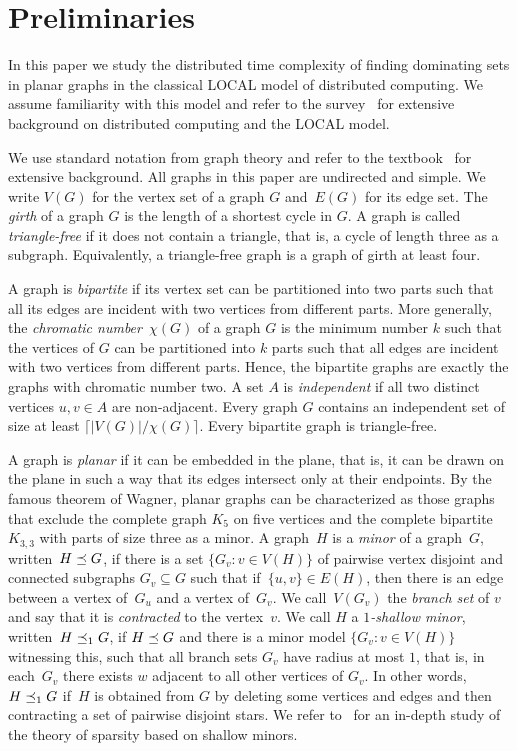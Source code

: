 
\section{Preliminaries}

In this paper we study the distributed time complexity of finding
dominating sets in planar graphs in the classical LOCAL model of
distributed computing.
We assume familiarity with this model and refer to the survey~\cite{suomela2013survey} for extensive
background on distributed computing and the LOCAL model.

We use standard notation from graph theory and refer to the
textbook~\cite{diestel} for extensive background.  All graphs in this
paper are undirected and simple. We write $V(G)$ for the vertex set of
a graph $G$ and~$E(G)$ for its edge set. The \emph{girth} of a graph
$G$ is the length of a shortest cycle in $G$. A graph is called
\emph{triangle-free} if it does not contain a triangle, that is, a
cycle of length three as a subgraph. Equivalently, a triangle-free
graph is a graph of girth at least four.

A graph is \emph{bipartite} if its vertex set can be partitioned into
two parts such that all its edges are incident with two vertices from
different parts. More generally, the \emph{chromatic number}~$\chi(G)$
of a graph $G$ is the minimum number $k$ such that the vertices of $G$
can be partitioned into $k$ parts such that all edges are incident
with two vertices from different parts. Hence, the bipartite graphs
are exactly the graphs with chromatic number two. A set $A$ is
\emph{independent} if all two distinct vertices $u,v\in A$ are
non-adjacent.  Every graph $G$ contains an independent set of size at
least $\lceil|V(G)|/\chi(G)\rceil$. Every bipartite graph is triangle-free.

A graph is \emph{planar} if it can be embedded in the plane, that is,
it can be drawn on the plane in such a way that its edges intersect
only at their endpoints. By the famous theorem of Wagner, planar
graphs can be characterized as those graphs that exclude the complete
graph $K_5$ on five vertices and the complete bipartite $K_{3,3}$ with
parts of size three as a minor.  A graph~$H$ is a \emph{minor} of a
graph~$G$, written~$H\preceq G$, if there is a set
\mbox{$\{G_v :v\in V(H)\}$} of pairwise vertex disjoint and connected
subgraphs $G_v\subseteq G$ such that if~$\{u,v\}\in E(H)$, then there
is an edge between a vertex of~$G_u$ and a vertex of~$G_v$. We
call~$V(G_v)$ the \emph{branch set} of $v$ and say that it is
\emph{contracted} to the vertex~$v$.  We call $H$ a \emph{$1$-shallow
  minor}, written~$H\preceq_1 G$, if $H\preceq G$ and there is a minor
model \mbox{$\{G_v :v\in V(H)\}$} witnessing this, such that all
branch sets $G_v$ have radius at most $1$, that is, in each~$G_v$
there exists $w$ adjacent to all other vertices of $G_v$. In other
words, $H\preceq_1 G$ if~$H$ is obtained from $G$ by deleting some
vertices and edges and then contracting a set of pairwise disjoint
stars. We refer to~\cite{nevsetvril2012sparsity} for an in-depth study
of the theory of sparsity based on shallow minors.

